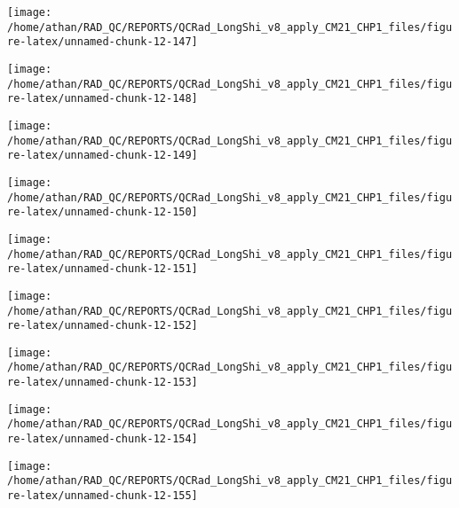 \documentclass[
  10pt,
  a4paper,oneside]{article}
\begin{document}
\begin{center}\texttt{[image: /home/athan/RAD\_QC/REPORTS/QCRad\_LongShi\_v8\_apply\_CM21\_CHP1\_files/figure-latex/unnamed-chunk-12-147]} \end{center}

\begin{center}\texttt{[image: /home/athan/RAD\_QC/REPORTS/QCRad\_LongShi\_v8\_apply\_CM21\_CHP1\_files/figure-latex/unnamed-chunk-12-148]} \end{center}

\begin{center}\texttt{[image: /home/athan/RAD\_QC/REPORTS/QCRad\_LongShi\_v8\_apply\_CM21\_CHP1\_files/figure-latex/unnamed-chunk-12-149]} \end{center}

\begin{center}\texttt{[image: /home/athan/RAD\_QC/REPORTS/QCRad\_LongShi\_v8\_apply\_CM21\_CHP1\_files/figure-latex/unnamed-chunk-12-150]} \end{center}

\begin{center}\texttt{[image: /home/athan/RAD\_QC/REPORTS/QCRad\_LongShi\_v8\_apply\_CM21\_CHP1\_files/figure-latex/unnamed-chunk-12-151]} \end{center}

\begin{center}\texttt{[image: /home/athan/RAD\_QC/REPORTS/QCRad\_LongShi\_v8\_apply\_CM21\_CHP1\_files/figure-latex/unnamed-chunk-12-152]} \end{center}

\begin{center}\texttt{[image: /home/athan/RAD\_QC/REPORTS/QCRad\_LongShi\_v8\_apply\_CM21\_CHP1\_files/figure-latex/unnamed-chunk-12-153]} \end{center}

\begin{center}\texttt{[image: /home/athan/RAD\_QC/REPORTS/QCRad\_LongShi\_v8\_apply\_CM21\_CHP1\_files/figure-latex/unnamed-chunk-12-154]} \end{center}

\begin{center}\texttt{[image: /home/athan/RAD\_QC/REPORTS/QCRad\_LongShi\_v8\_apply\_CM21\_CHP1\_files/figure-latex/unnamed-chunk-12-155]} \end{center}
\end{document}
